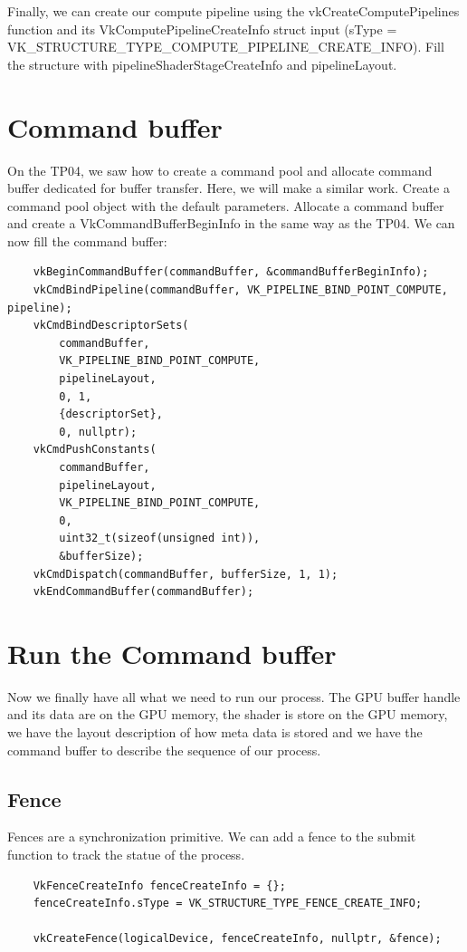 \documentclass{article}
\begin{document}
Finally, we can create our compute pipeline using the vkCreateComputePipelines function and its VkComputePipelineCreateInfo struct input (sType = VK\_STRUCTURE\_TYPE\_COMPUTE\_PIPELINE\_CREATE\_INFO). Fill the structure with pipelineShaderStageCreateInfo and pipelineLayout.

\section{Command buffer}
On the TP04, we saw how to create a command pool and allocate command buffer dedicated for buffer transfer. Here, we will make a similar work. Create a command pool object with the default parameters. Allocate a command buffer and create a VkCommandBufferBeginInfo in the same way as the TP04. We can now fill the command buffer:
\begin{lstlisting}
	vkBeginCommandBuffer(commandBuffer, &commandBufferBeginInfo);
	vkCmdBindPipeline(commandBuffer, VK_PIPELINE_BIND_POINT_COMPUTE, pipeline);
	vkCmdBindDescriptorSets(
		commandBuffer,
		VK_PIPELINE_BIND_POINT_COMPUTE,
		pipelineLayout,
		0, 1,
		{descriptorSet},
		0, nullptr);
	vkCmdPushConstants(
		commandBuffer,
		pipelineLayout,
		VK_PIPELINE_BIND_POINT_COMPUTE,
		0,
		uint32_t(sizeof(unsigned int)),
		&bufferSize);
	vkCmdDispatch(commandBuffer, bufferSize, 1, 1);
	vkEndCommandBuffer(commandBuffer);
\end{lstlisting}

\section{Run the Command buffer}
Now we finally have all what we need to run our process. The GPU buffer handle and its data are on the GPU memory, the shader is store on the GPU memory, we have the layout description of how meta data is stored and we have the command buffer to describe the sequence of our process.
\subsection{Fence}
Fences are a synchronization primitive. We can add a fence to the submit function to track the statue of the process.
\begin{lstlisting}
	VkFenceCreateInfo fenceCreateInfo = {};
	fenceCreateInfo.sType = VK_STRUCTURE_TYPE_FENCE_CREATE_INFO;

	vkCreateFence(logicalDevice, fenceCreateInfo, nullptr, &fence);
\end{lstlisting}
\end{document}

